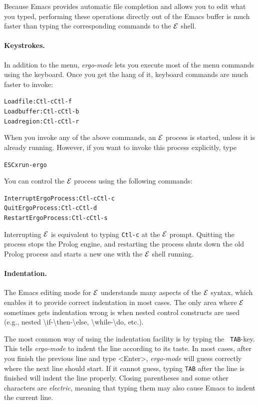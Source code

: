 \documentclass[11pt]{article}
\newcommand{\ERGO}{\mbox{\ensuremath{\cal{E}}\smaller{{\sc{RGO}}}}\xspace}
\newcommand{\FLSYSTEM}{\ERGO}
\newcommand{\ERGOMODE}{ergo-mode}
\newcommand{\floraname}{Ergo}
\newcommand{\bs}{\textbackslash}
\begin{document}
Because Emacs provides automatic file completion and allows you to edit
what you typed, performing these operations directly out of the Emacs
buffer is much faster than typing the corresponding commands to the \FLSYSTEM
shell.

\paragraph{Keystrokes.}
In addition to the menu, \emph{\ERGOMODE} lets you execute most of the
menu commands using the keyboard. Once you get the hang of it, keyboard
commands are much faster to invoke:
\begin{alltt}
Load file:                 Ctl-c Ctl-f
Load buffer:               Ctl-c Ctl-b
Load region:               Ctl-c Ctl-r
\end{alltt}
When you invoke any of the above commands, an \FLSYSTEM process is started,
unless it is already running. However, if you want to invoke this process
explicitly, type
\begin{alltt}
ESC x run-ergo  
\end{alltt}
You can control the \FLSYSTEM process using the following commands:
\begin{alltt}
Interrupt \floraname Process:      Ctl-c Ctl-c
Quit \floraname Process:           Ctl-c Ctl-d
Restart \floraname Process:        Ctl-c Ctl-s
\end{alltt}
Interrupting \FLSYSTEM is equivalent to typing {\tt Ctl-c} at the \FLSYSTEM
prompt. Quitting the process stops the Prolog engine, and restarting the
process shuts down the old Prolog process and starts a new one with the \FLSYSTEM
shell running. 

\paragraph{Indentation.}
The Emacs editing mode for \FLSYSTEM
understands many aspects of the \FLSYSTEM syntax, which
enables it to provide correct indentation in most cases.
The only area where \FLSYSTEM sometimes gets indentation wrong is when nested
control constructs are used (e.g., nested \bs{}if-\bs{}then-\bs{}else,
\bs{}while-\bs{}do, etc.).

The most common way of using the indentation facility is by typing the {\tt
  TAB}-key. This tells \emph{\ERGOMODE}
to indent the line according to its taste.
In most cases, after you finish the previous line and type <Enter>,
\emph{\ERGOMODE}  will guess correctly where the next line should start.
If it cannot guess, typing \texttt{TAB}   after the line is finished will
indent the line properly. Closing parentheses and some other characters are
\emph{electric}, meaning that typing them may also cause Emacs to indent the
current line.  
\end{document}
